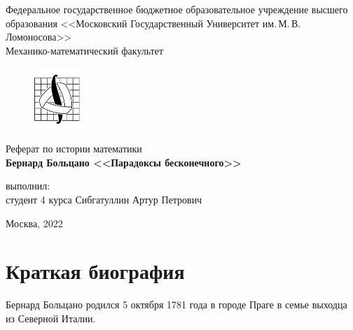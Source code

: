 \documentclass[12pt]{extarticle}
\begin{document}
\renewcommand{\contentsname}{Содержание}
\newenvironment{changemargin}[1]{
  \begin{list}{}{
    \setlength{\voffset}{#1}
  }
  \item[]}{\end{list}}


\begin{titlepage}
	\begin{center}
		
		Федеральное государственное бюджетное образовательное учреждение высшего образования 
		<<Московский Государственный Университет им.\,М.\,В.\,Ломоносова>>\\
		
		Механико-математический факультет
		
		\begin{figure}[!htp]
			\begin{center}
				{\includegraphics[width=20mm]{mmlogo.png}}
			\end{center}
		\end{figure}
		
		\vspace{3cm}
		
		Реферат по истории математики\\
		{\bf Бернард Больцано <<Парадоксы бесконечного>>}
		
		\vspace{8cm}
		\begin{flushright}
			{ выполнил:}\\
			студент 4 курса Сибгатуллин Артур Петрович\\[0.5cm]
		\end{flushright}
		\vspace{1cm}
		
		\normalsize Москва, 2022
	\end{center}
\end{titlepage}


\tableofcontents

\newpage
\section{Краткая биография}

Бернард Больцано родился 5 октября 1781 года в городе Праге в семье выходца из Северной Италии.
\end{document}
